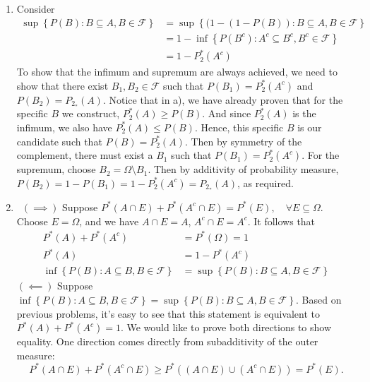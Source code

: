 \documentclass[12pt]{article}
\begin{document}
\begin{problem}[5]
\begin{enumerate}[label=\alph*)]
	\item Consider
		~\begin{align*}
			\sup\left\{ P(B):B \subseteq A, B \in \mathcal{F} \right\} &= \sup\left\{ (1-(1-P(B)):B \subseteq A, B \in \mathcal{F} \right\}  \\
										   &= 1 - \inf\left\{ P(B^{c}): A^{c} \subseteq B^{c}, B^{c} \in \mathcal{F} \right\}  \\
										   &= 1- P_2^*(A^{c})
		\end{align*}
		To show that the infimum and supremum are always achieved, we need to show that there exist $B_1, B_2 \in \mathcal{F}$ such that $P(B_1) = P_2^*(A^{c}) $ and $P(B_2) = P_2_* (A)$. Notice that in a), we have already proven that for the specific $B$ we construct, $P_2^*(A) \geq P(B)$. And since $P_2^* (A)$ is the infimum, we also have $P_2^* (A) \leq P(B)$. Hence, this specific $B$ is our candidate  such that $P(B) = P_2^* (A) $. Then by symmetry of the complement, there must exist a $B_1$ such that $P(B_1) = P_2^* (A^{c})$. For the supremum, choose $B_2 = \Omega \setminus B_1$. Then by additivity of probability measure, $P(B_2) = 1- P(B_1) = 1- P_2^* (A^{c}) = P_2_*(A)$, as required.
	\item ~$(\implies)$ Suppose $P^* (A \cap E) + P^* (A^{c} \cap E) = P^* (E), \quad \forall E \subseteq \Omega$. Choose $E = \Omega$, and we have $A \cap E = A$, $A^{c} \cap E = A^{c}$. It follows that 
		\begin{align*}
			P^* (A) + P^* (A^{c}) &= P^* (\Omega) =1 \\
			P^* (A) &= 1- P^* (A^{c})\\
			\inf\left\{P(B): A \subseteq B, B \in \mathcal{F} \right\} &= \sup\left\{ P(B): B \subseteq A, B \in \mathcal{F} \right\} 
		\end{align*}
		$(\impliedby)$ Suppose $\inf\left\{P(B): A \subseteq B, B \in \mathcal{F} \right\} = \sup\left\{ P(B): B \subseteq A, B \in \mathcal{F} \right\} $. Based on previous problems, it's easy to see that this statement is equivalent to $P^* (A) + P^* (A^{c}) = 1$. We would like to prove both directions to show equality. One direction comes directly from subadditivity of the outer measure: \[P^* (A \cap E) + P^* (A^{c} \cap E) \geq P^*((A \cap E) \cup (A^{c} \cap E)) = P^* (E).\] 
		

\end{enumerate}
\end{problem}
\end{document}
